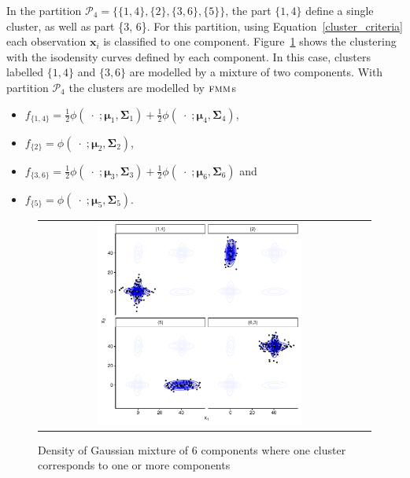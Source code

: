 \documentclass[submit]{smj}
\theoremstyle{definition}
\newcommand{\m}[1]{\boldsymbol{#1}}
\newcommand{\fmm}{\textsc{fmm}\xspace}
\begin{document}
In the partition $\mathcal{P}_4 = \{\{1, 4\},\{2\}, \{3, 6\}, \{5\} \}$, the part $\{1, 4\}$ define a single cluster, as well as part \{3, 6\}. For this partition, using Equation~\ref{cluster_criteria} each observation $\m x_i$ is classified to one component. Figure~\ref{ex_two_one} shows the clustering with the isodensity curves defined by each component. In this case, clusters labelled $\{1,4\}$ and $\{3, 6\}$ are modelled by a mixture of two components. With partition $\mathcal{P}_4$ the clusters are modelled by $\fmm$s
\begin{itemize}
\item $f_{\{1,4\}} = \frac{1}{2} \phi(\;\cdot\; ;  \m\mu_1, \m\Sigma_1) + \frac{1}{2} \phi(\;\cdot\; ;  \m\mu_4, \m\Sigma_4)$, 
\item $f_{\{2\}} = \phi(\;\cdot\; ;  \m\mu_2, \m\Sigma_2)$, 
\item $f_{\{3,6\}} =  \frac{1}{2} \phi(\;\cdot\; ;  \m\mu_3, \m\Sigma_3) + \frac{1}{2} \phi(\;\cdot\; ;  \m\mu_6, \m\Sigma_6)$ and
\item $f_{\{5\}} = \phi(\;\cdot\; ;  \m\mu_5, \m\Sigma_5)$.
\end{itemize}

\begin{figure}[h]
\begin{center}
\begin{tabular}{cc}
  \includegraphics[width=0.65\textwidth]{figures/partition-example-part4.pdf} \\
 \end{tabular}
 \caption{Density of Gaussian mixture of 6 components where one cluster corresponds to one or more components}\label{ex_two_one}
\end{center}
\end{figure}
\end{document}
